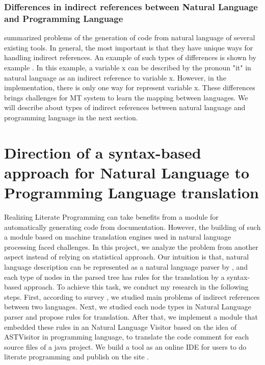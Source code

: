 \subsubsection{Differences in indirect references between Natural Language and Programming Language}
\cite{} summarized problems of the generation of code from natural language of several existing tools. In general, the most important is that they have unique ways for handling indirect references. An example of such types of differences is shown by example \cite{}. In this example, a variable x can be described by the pronoun "it" in natural language as an indirect reference to variable x. However, in the implementation, there is only one way for represent variable x. These differences brings challenges for MT system to learn the mapping between languages. We will describe about types of indirect references between natural language and programming language in the next section.


\section{Direction of  a syntax-based approach for Natural Language to Programming Language translation}
Realizing Literate Programming can take benefits from a module for automatically generating code from documentation. However, the building of such a module based on machine translation engines used in natural language processing faced challenges. In this project, we analyze the problem from another aspect instead of relying on statistical approach. Our intuition is that, natural language description can be represented as a natural language parser by \cite{}, and each type of nodes in the parsed tree has rules for the translation by a syntax-based approach. To achieve this task, we conduct my research in the following steps.  First, according to survey \cite{}, we studied main problems of indirect references between two languages. Next, we studied each node types in Natural Language parser and propose rules for translation. After that, we implement a module that embedded these rules in an Natural Language Visitor based on the idea of ASTVisitor in programming language, to translate the code comment for each source files of a java project. We build a tool as an online IDE for users to do literate programming and publish on the site \cite{}. 










